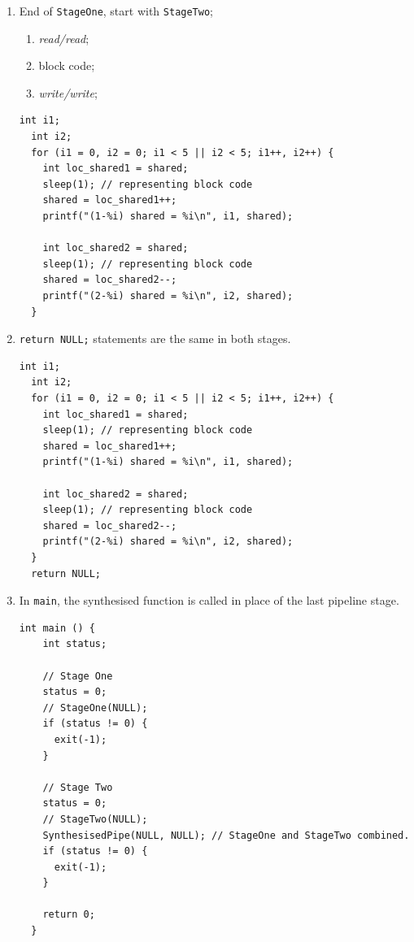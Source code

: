\documentclass{llncs}
\begin{document}
\begin{enumerate}
\begin{enumerate}
  \item End of \lstinline|StageOne|, start with \lstinline|StageTwo|;
    \begin{enumerate}
    \item \emph{read/read};
    \item block code;
    \item \emph{write/write};
    \end{enumerate}
  \begin{lstlisting}[frame=single]
  int i1;
  int i2;
  for (i1 = 0, i2 = 0; i1 < 5 || i2 < 5; i1++, i2++) {
    int loc_shared1 = shared;
    sleep(1); // representing block code
    shared = loc_shared1++;
    printf("(1-%i) shared = %i\n", i1, shared);  
   
    int loc_shared2 = shared;
    sleep(1); // representing block code
    shared = loc_shared2--;
    printf("(2-%i) shared = %i\n", i2, shared);
  }
  \end{lstlisting}
    
  \item \lstinline|return NULL;| statements are the same in both stages.
  \begin{lstlisting}[frame=single]
  int i1;
  int i2;
  for (i1 = 0, i2 = 0; i1 < 5 || i2 < 5; i1++, i2++) {
    int loc_shared1 = shared;
    sleep(1); // representing block code
    shared = loc_shared1++;
    printf("(1-%i) shared = %i\n", i1, shared);  
   
    int loc_shared2 = shared;
    sleep(1); // representing block code
    shared = loc_shared2--;
    printf("(2-%i) shared = %i\n", i2, shared);
  }
  return NULL;
  \end{lstlisting}
  
  \item In \lstinline|main|, the synthesised function is called in place of the last pipeline stage.
  \begin{lstlisting}[frame=single]
  int main () {
    int status;
  
    // Stage One
    status = 0;
    // StageOne(NULL);
    if (status != 0) {
      exit(-1);
    }
  
    // Stage Two
    status = 0;
    // StageTwo(NULL);
    SynthesisedPipe(NULL, NULL); // StageOne and StageTwo combined.
    if (status != 0) {
      exit(-1);
    }
  
    return 0;
  }
  \end{lstlisting}
  \end{enumerate}


\end{enumerate}
\end{document}
